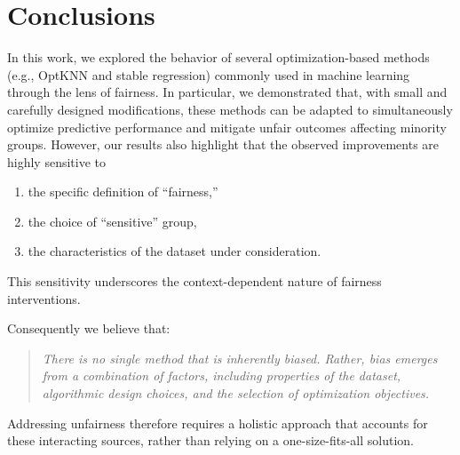 \documentclass{article}
\begin{document}
\section{Conclusions}
In this work, we explored the behavior of several optimization-based methods (e.g., OptKNN and stable regression) commonly used in machine learning through the lens of fairness. In particular, we demonstrated that, with small and carefully designed modifications, these methods can be adapted to simultaneously optimize predictive performance and mitigate unfair outcomes affecting minority groups. 
However, our results also highlight that the observed improvements are highly sensitive to 
\begin{enumerate}
    \item the specific definition of ``fairness,''
    \item the choice of ``sensitive'' group,
    \item the characteristics of the dataset under consideration.
\end{enumerate}
This sensitivity underscores the context-dependent nature of fairness interventions.
\par Consequently we believe that: 
\begin{quote}
\textit{There is no single method that is inherently biased. Rather, bias emerges from a combination of factors, including properties of the dataset, algorithmic design choices, and the selection of optimization objectives. }
\end{quote}
Addressing unfairness therefore requires a holistic approach that accounts for these interacting sources, rather than relying on a one-size-fits-all solution.

% 
\printbibliography
\end{document}
